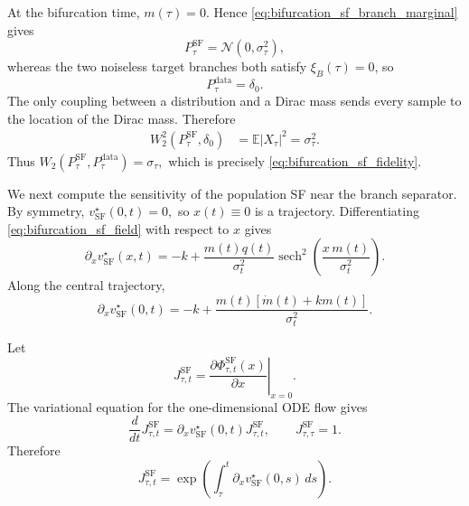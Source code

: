 At the bifurcation time, $m(\tau)=0$. Hence
\eqref{eq:bifurcation_sf_branch_marginal} gives
\begin{equation}
    P_{\tau}^{\mathrm{SF}}
    =
    \mathcal N(0,\sigma_\tau^2),
\end{equation}
whereas the two noiseless target branches both satisfy
$\xi_B(\tau)=0$, so
\begin{equation}
    P_{\tau}^{\mathrm{data}}=\delta_0.
\end{equation}
The only coupling between a distribution and a Dirac mass sends every
sample to the location of the Dirac mass. Therefore
\begin{align}
    W_2^2\!\left(
        P_{\tau}^{\mathrm{SF}},
        \delta_0
    \right)
    &=
    \mathbb E|X_\tau|^2
    = \sigma_\tau^2.
\end{align}
Thus
$W_2\!\left(
        P_{\tau}^{\mathrm{SF}},
        P_{\tau}^{\mathrm{data}}
    \right)  =
    \sigma_\tau,$
which is precisely
\eqref{eq:bifurcation_sf_fidelity}.

We next compute the sensitivity of the population SF near
the branch separator. By symmetry,
$v_{\mathrm{SF}}^\star(0,t)=0,$
so $x(t)\equiv0$ is a trajectory. Differentiating
\eqref{eq:bifurcation_sf_field} with respect to $x$ gives
\begin{equation}
    \partial_xv_{\mathrm{SF}}^\star(x,t)
    =
    -k
    +
    \frac{
        m(t)q(t)
    }{
        \sigma_t^2
    }
    \operatorname{sech}^2\!\left(
        \frac{x\,m(t)}{\sigma_t^2}
    \right).
\end{equation}
Along the central trajectory,
\begin{equation}
    \partial_xv_{\mathrm{SF}}^\star(0,t)
    =
    -k
    +
    \frac{
        m(t)[\dot m(t)+km(t)]
    }{
        \sigma_t^2
    }.
    \label{eq:bifurcation_sf_central_jacobian}
\end{equation}

Let
\begin{equation}
    J_{\tau,t}^{\mathrm{SF}}
    =
    \left.
    \frac{\partial
        \Phi_{\tau,t}^{\mathrm{SF}}(x)}
        {\partial x}
    \right|_{x=0}.
\end{equation}
The variational equation for the one-dimensional ODE flow gives
\begin{equation}
    \frac{d}{dt}J_{\tau,t}^{\mathrm{SF}}
    =
    \partial_xv_{\mathrm{SF}}^\star(0,t)
    J_{\tau,t}^{\mathrm{SF}},
    \qquad
    J_{\tau,\tau}^{\mathrm{SF}}=1.
\end{equation}
Therefore
\begin{equation}
    J_{\tau,t}^{\mathrm{SF}}
    =
    \exp\!\left(
        \int_\tau^t
        \partial_xv_{\mathrm{SF}}^\star(0,s)\,ds
    \right).
    \label{eq:bifurcation_sf_variational_solution}
\end{equation}


